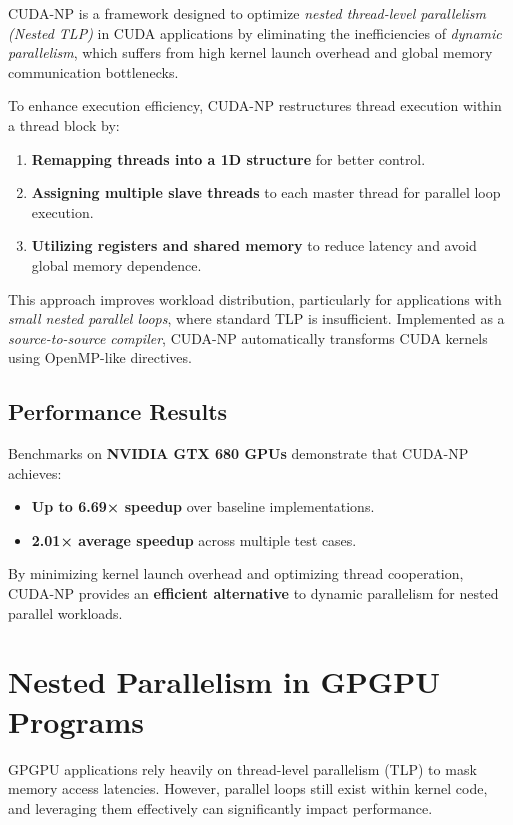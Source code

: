 \documentclass{report}
\begin{document}
CUDA-NP is a framework designed to optimize \textit{nested thread-level parallelism (Nested TLP)} in CUDA applications by eliminating the inefficiencies of \textit{dynamic parallelism}, which suffers from high kernel launch overhead and global memory communication bottlenecks.

To enhance execution efficiency, CUDA-NP restructures thread execution within a thread block by:
\begin{enumerate}
    \item \textbf{Remapping threads into a 1D structure} for better control.
    \item \textbf{Assigning multiple slave threads} to each master thread for parallel loop execution.
    \item \textbf{Utilizing registers and shared memory} to reduce latency and avoid global memory dependence.
\end{enumerate}

This approach improves workload distribution, particularly for applications with \textit{small nested parallel loops}, where standard TLP is insufficient. Implemented as a \textit{source-to-source compiler}, CUDA-NP automatically transforms CUDA kernels using OpenMP-like directives.

\subsection{Performance Results}
Benchmarks on \textbf{NVIDIA GTX 680 GPUs} demonstrate that CUDA-NP achieves:
\begin{itemize}
    \item \textbf{Up to 6.69× speedup} over baseline implementations.
    \item \textbf{2.01× average speedup} across multiple test cases.
\end{itemize}

By minimizing kernel launch overhead and optimizing thread cooperation, CUDA-NP provides an \textbf{efficient alternative} to dynamic parallelism for nested parallel workloads.



\section{Nested Parallelism in GPGPU Programs}

GPGPU applications rely heavily on thread-level parallelism (TLP) to mask memory access latencies. However, parallel loops still exist within kernel code, and leveraging them effectively can significantly impact performance.
\end{document}
